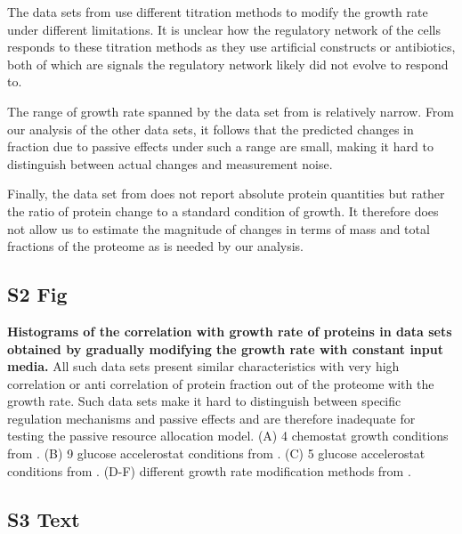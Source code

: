 \documentclass[10pt,letterpaper]{article}
\begin{document}
The data sets from \cite{Hui_2015} use different titration methods to modify the growth rate under different limitations.
It is unclear how the regulatory network of the cells responds to these titration methods as they use artificial constructs or antibiotics, both of which are signals the regulatory network likely did not evolve to respond to.

The range of growth rate spanned by the data set from \cite{Hui_2015} is relatively narrow.
From our analysis of the other data sets, it follows that the predicted changes in fraction due to passive effects under such a range are small, making it hard to distinguish between actual changes and measurement noise.

Finally, the data set from \cite{Hui_2015} does not report absolute protein quantities but rather the ratio of protein change to a standard condition of growth.
It therefore does not allow us to estimate the magnitude of changes in terms of mass and total fractions of the proteome as is needed by our analysis.

\subsection*{S2 Fig}
\label{fig:grcorr_dbs}
    {\bf Histograms of the correlation with growth rate of proteins in data sets obtained by gradually modifying the growth rate with constant input media.}
All such data sets present similar characteristics with very high correlation or anti correlation of protein fraction out of the proteome with the growth rate.
Such data sets make it hard to distinguish between specific regulation mechanisms and passive effects and are therefore inadequate for testing the passive resource allocation model.
(A) 4 chemostat growth conditions from \cite{Schmidt2015}.
(B) 9 glucose accelerostat conditions from \cite{Peebo_2015}.
(C) 5 glucose accelerostat conditions from \cite{Valgepea2013}.
(D-F) different growth rate modification methods from \cite{Hui_2015}.


\subsection*{S3 Text}
\label{dbscorr}
\end{document}
